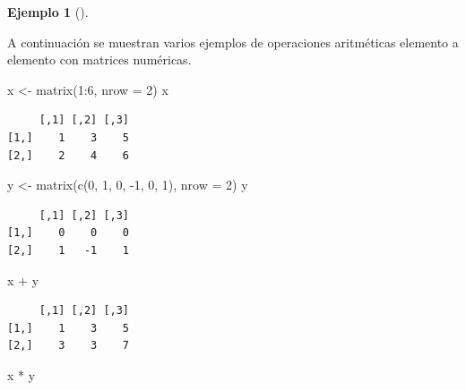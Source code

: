 \documentclass[
  a4paper,
]{scrreport}
\newenvironment{Shaded}{\begin{snugshade}}{\end{snugshade}}
\newcommand{\AttributeTok}[1]{\textcolor[rgb]{0.40,0.45,0.13}{#1}}
\newcommand{\DecValTok}[1]{\textcolor[rgb]{0.68,0.00,0.00}{#1}}
\newcommand{\FunctionTok}[1]{\textcolor[rgb]{0.28,0.35,0.67}{#1}}
\newcommand{\NormalTok}[1]{\textcolor[rgb]{0.00,0.23,0.31}{#1}}
\newcommand{\OtherTok}[1]{\textcolor[rgb]{0.00,0.23,0.31}{#1}}
\newcommand{\SpecialCharTok}[1]{\textcolor[rgb]{0.37,0.37,0.37}{#1}}
\theoremstyle{definition}
\theoremstyle{definition}
\newtheorem{example}{Ejemplo}[chapter]
\theoremstyle{remark}
\begin{document}
\leavevmode{}%
\begin{example}[]\label{exm-operaciones-aritmeticas-matrices}

A continuación se muestran varios ejemplos de operaciones aritméticas
elemento a elemento con matrices numéricas.

\begin{Shaded}
\begin{Highlighting}[]
\NormalTok{x }\OtherTok{\textless{}{-}} \FunctionTok{matrix}\NormalTok{(}\DecValTok{1}\SpecialCharTok{:}\DecValTok{6}\NormalTok{, }\AttributeTok{nrow =} \DecValTok{2}\NormalTok{)}
\NormalTok{x}
\end{Highlighting}
\end{Shaded}

\begin{verbatim}
     [,1] [,2] [,3]
[1,]    1    3    5
[2,]    2    4    6
\end{verbatim}

\begin{Shaded}
\begin{Highlighting}[]
\NormalTok{y }\OtherTok{\textless{}{-}} \FunctionTok{matrix}\NormalTok{(}\FunctionTok{c}\NormalTok{(}\DecValTok{0}\NormalTok{, }\DecValTok{1}\NormalTok{, }\DecValTok{0}\NormalTok{, }\SpecialCharTok{{-}}\DecValTok{1}\NormalTok{, }\DecValTok{0}\NormalTok{, }\DecValTok{1}\NormalTok{), }\AttributeTok{nrow =} \DecValTok{2}\NormalTok{)}
\NormalTok{y}
\end{Highlighting}
\end{Shaded}

\begin{verbatim}
     [,1] [,2] [,3]
[1,]    0    0    0
[2,]    1   -1    1
\end{verbatim}

\begin{Shaded}
\begin{Highlighting}[]
\NormalTok{x }\SpecialCharTok{+}\NormalTok{ y}
\end{Highlighting}
\end{Shaded}

\begin{verbatim}
     [,1] [,2] [,3]
[1,]    1    3    5
[2,]    3    3    7
\end{verbatim}

\begin{Shaded}
\begin{Highlighting}[]
\NormalTok{x }\SpecialCharTok{*}\NormalTok{ y}
\end{Highlighting}
\end{Shaded}


\end{example}
\end{document}
